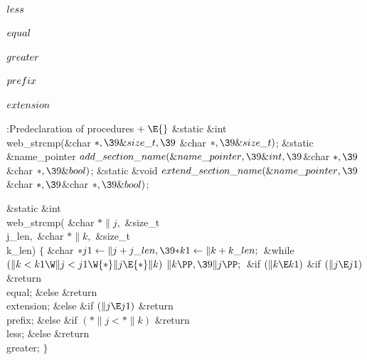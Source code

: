 \Y\B\4\D$\\{less}$ \5
\par
\B\4\D$\\{equal}$ \5
\par
\B\4\D$\\{greater}$ \5
\par
\B\4\D$\\{prefix}$ \5
\par
\B\4\D$\\{extension}$ \5
\par
\Y\B\4:Predeclaration of procedures\X${}\mathrel+\E{}$\6
\&{static} \&{int} \\{web\_strcmp}(\&{char} ${}{*},\39\&{size\_t},\39{}$%
\&{char} ${}{*},\39\&{size\_t}){}$;\6
\&{static} \&{name\_pointer} ${}\\{add\_section\_name}(\&{name\_pointer},\39%
\&{int},\39{}$\&{char} ${}{*},\39{}$\&{char} ${}{*},\39\&{bool}){}$;\6
\&{static} \&{void} ${}\\{extend\_section\_name}(\&{name\_pointer},\39{}$%
\&{char} ${}{*},\39{}$\&{char} ${}{*},\39\&{bool}){}$;\par
\fi

\B\1\1\&{static} \&{int} \\{web\_strcmp}(\6
\&{char} ${}{*}\|j,{}$\6
\&{size\_t} \\{j\_len}${},{}$\6
\&{char} ${}{*}\|k,{}$\6
\&{size\_t} \\{k\_len})\2\2\6
${}\{{}$\1\6
\&{char} ${}{*}\\{j1}\K\|j+\\{j\_len},\39{*}\\{k1}\K\|k+\\{k\_len};{}$\7
\&{while} ${}(\|k<\\{k1}\W\|j<\\{j1}\W{*}\|j\E{*}\|k){}$\1\5
${}\|k\PP,\39\|j\PP;{}$\2\6
\&{if} ${}(\|k\E\\{k1}){}$\1\6
\&{if} ${}(\|j\E\\{j1}){}$\1\5
\&{return} \\{equal};\2\6
\&{else}\1\5
\&{return} \\{extension};\2\2\6
\&{else} \&{if} ${}(\|j\E\\{j1}){}$\1\5
\&{return} \\{prefix};\2\6
\&{else} \&{if} ${}({*}\|j<{*}\|k){}$\1\5
\&{return} \\{less};\2\6
\&{else}\1\5
\&{return} \\{greater};\2\6
\4${}\}{}$\2\par
\fi

